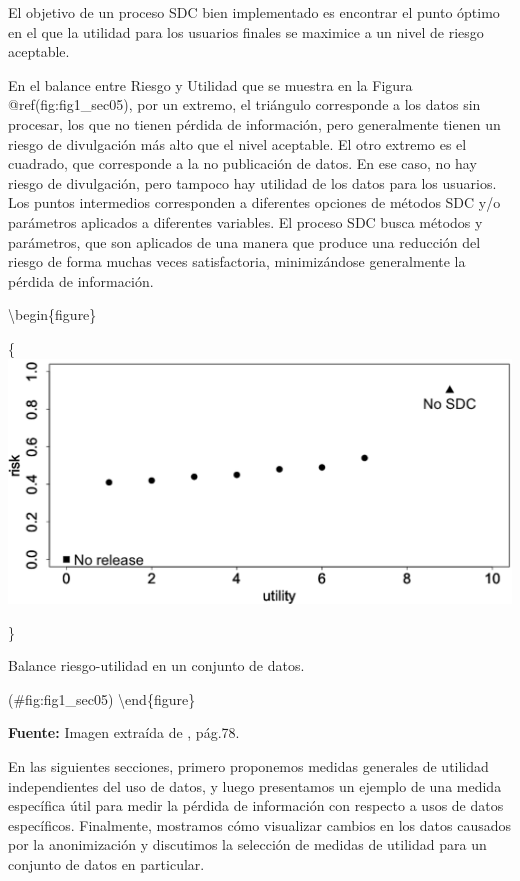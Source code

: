\documentclass[]{book}
\theoremstyle{definition}
\theoremstyle{definition}
\theoremstyle{definition}
\theoremstyle{definition}
\theoremstyle{remark}
\begin{document}
El objetivo de un proceso SDC bien implementado es encontrar el punto óptimo en el que la utilidad para los usuarios finales se maximice a un nivel de riesgo aceptable.

En el balance entre Riesgo y Utilidad que se muestra en la Figura @ref(fig:fig1\_sec05), por un extremo, el triángulo corresponde a los datos sin procesar, los que no tienen pérdida de información, pero generalmente tienen un riesgo de divulgación más alto que el nivel aceptable. El otro extremo es el cuadrado, que corresponde a la no publicación de datos. En ese caso, no hay riesgo de divulgación, pero tampoco hay utilidad de los datos para los usuarios. Los puntos intermedios corresponden a diferentes opciones de métodos SDC y/o parámetros aplicados a diferentes variables. El proceso SDC busca
métodos y parámetros, que son aplicados de una manera que produce una reducción del riesgo de forma muchas veces satisfactoria, minimizándose generalmente la pérdida de información.

\textbackslash{}begin\{figure\}

\{\centering \includegraphics[width=0.9\linewidth]{Imagenes/fig1}

\}

\caption{Balance riesgo-utilidad en un conjunto de datos.}

(\#fig:fig1\_sec05)
\textbackslash{}end\{figure\}

\textbf{Fuente:} Imagen extraída de \citep{benschop2021}, pág.78.

En las siguientes secciones, primero proponemos medidas generales de utilidad independientes del uso de datos, y luego presentamos un ejemplo de una medida específica útil para medir la pérdida de información con respecto a usos de datos específicos. Finalmente, mostramos cómo visualizar cambios en los datos causados por la anonimización y discutimos la selección de medidas de utilidad para un conjunto de datos en particular.
\end{document}
